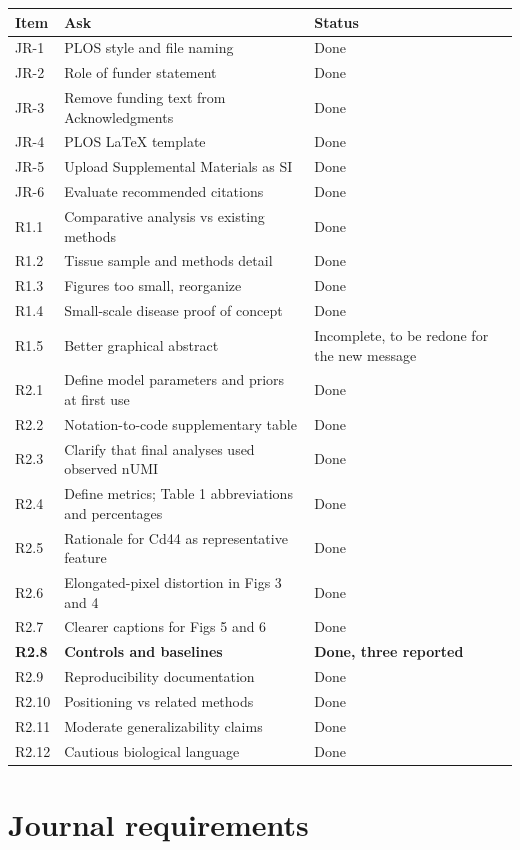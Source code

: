 \documentclass[11pt]{article}
\begin{document}
\begin{longtable}{@{}L{1.6cm} L{9.2cm} L{3.6cm}@{}}
\toprule
\textbf{Item} & \textbf{Ask} & \textbf{Status} \\
\midrule
\endhead
JR-1  & PLOS style and file naming & Done \\
JR-2  & Role of funder statement & Done \\
JR-3  & Remove funding text from Acknowledgments & Done \\
JR-4  & PLOS \LaTeX{} template & Done \\
JR-5  & Upload Supplemental Materials as SI & Done \\
JR-6  & Evaluate recommended citations & Done \\
\midrule
R1.1  & Comparative analysis vs existing methods & Done \\
R1.2  & Tissue sample and methods detail & Done \\
R1.3  & Figures too small, reorganize & Done \\
R1.4  & Small-scale disease proof of concept & Done \\
R1.5  & Better graphical abstract & Incomplete, to be redone for the new message \\
\midrule
R2.1  & Define model parameters and priors at first use & Done \\
R2.2  & Notation-to-code supplementary table & Done \\
R2.3  & Clarify that final analyses used observed nUMI & Done \\
R2.4  & Define metrics; Table 1 abbreviations and percentages & Done \\
R2.5  & Rationale for Cd44 as representative feature & Done \\
R2.6  & Elongated-pixel distortion in Figs 3 and 4 & Done \\
R2.7  & Clearer captions for Figs 5 and 6 & Done \\
\textbf{R2.8} & \textbf{Controls and baselines} & \textbf{Done, three reported} \\
R2.9  & Reproducibility documentation & Done \\
R2.10 & Positioning vs related methods & Done \\
R2.11 & Moderate generalizability claims & Done \\
R2.12 & Cautious biological language & Done \\
\bottomrule
\end{longtable}
\fi

\section{Journal requirements}
\end{document}
